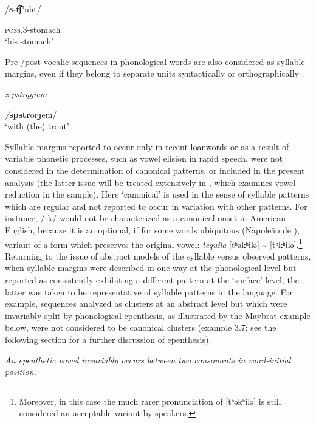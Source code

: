\ea\label{ex:3.5}

/\textbf{s-t͡ʃ’}uht/

\textsc{poss.3}-stomach\\
\glt ‘his stomach’
\citep[24]{Polian2006}
\z

Pre-/post-vocalic sequences in phonological words are also considered as syllable margins, even if they belong to separate units syntactically or orthographically .

\ea\label{ex:3.6}

\textit{z pstrągiem}

\textit{/}\textbf{spstr}oŋɟem/\\
\glt ‘with (the) trout’
\citep[103]{Jassem2003}
\z

  Syllable margins reported to occur only in recent loanwords or as a result of variable phonetic processes, such as vowel elision in rapid speech, were not considered in the determination of canonical patterns, or included in the present analysis (the latter issue will be treated extensively in , which examines vowel reduction in the sample). Here ‘canonical’ is used in the sense of syllable patterns which are regular and not reported to occur in variation with other patterns. For instance, /tk/ would not be characterized as a canonical onset in American English, because it is an optional, if for some words ubiquitous (Napoleão de \citealt{Souza2019}), variant of a form which preserves the original vowel: \textit{tequila} [tʰəkʰilə] {\textasciitilde} [tʰkʰilə].\footnote{{Moreover, in this case the much rarer pronunciation of [tʰəkʰilə] is still considered an acceptable variant by speakers.}} Returning to the issue of abstract models of the syllable versus observed patterns, when syllable margins were described in one way at the phonological level but reported as consistently exhibiting a different pattern at the ‘surface’ level, the latter was taken to be representative of syllable patterns in the language. For example, sequences analyzed as clusters at an abstract level but which were invariably split by phonological epenthesis, as illustrated by the Maybrat example below, were not considered to be canonical clusters (example 3.7; see the following section for a further discussion of epenthesis).

\ea\label{ex:3.7}

\textit{An epenthetic vowel invariably occurs between two consonants in word-initial position.}

